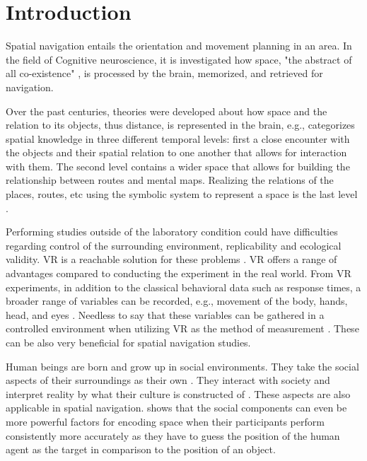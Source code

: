\chapter{Introduction}


Spatial navigation entails the orientation and movement planning in an area. In the field of Cognitive neuroscience, it is investigated how space, "the abstract of all co-existence" \autocite{spencer1989}, is processed by the brain, memorized, and retrieved for navigation. 

Over the past centuries, theories were developed about how space and the relation to its objects, thus distance, is represented in the brain, e.g., \textcite{cassirer1955philosophy} categorizes spatial knowledge in three different temporal levels: first a close encounter with the objects and their spatial relation to one another that allows for interaction with them. The second level contains a wider space that allows for building the relationship between routes and mental maps. Realizing the relations of the places, routes, etc using the symbolic system to represent a space is the last level \autocite{cassirer1955philosophy}. 

Performing studies outside of the laboratory condition could have difficulties regarding control of the surrounding environment, replicability and ecological validity. VR is a reachable solution for these problems \autocite{pan2018and, diersch2019potential, chicchi2017novel}. VR offers a range of advantages compared to conducting the experiment in the real world. From VR experiments, in addition to the classical behavioral data such as response times, a broader range of variables can be recorded, e.g., movement of the body, hands, head, and eyes \autocite{pan2018and}. Needless to say that these variables can be gathered in a controlled environment when utilizing VR as the method of measurement \autocite{mcilvenny2020future}. These can be also very beneficial for spatial navigation studies.

Human beings are born and grow up in social environments. They take the social aspects of their surroundings as their own \autocite{berger1967luckman}. They interact with society and interpret reality by what their culture is constructed of \autocite{SIEGEL19759}. These aspects are also applicable in spatial navigation. \textcite{kuehn2018social} shows that the social components can even be more powerful factors for encoding space when their participants perform consistently more accurately as they have to guess the position of the human agent as the target in comparison to the position of an object.

